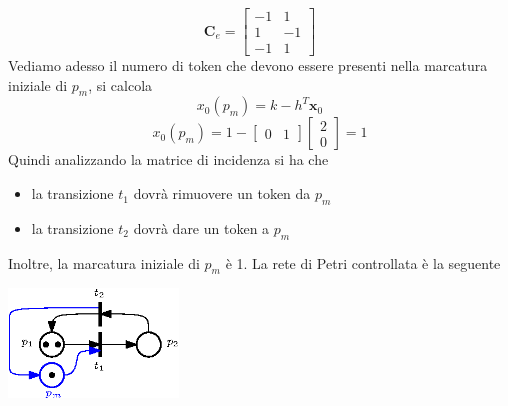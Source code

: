 \documentclass[10pt, letterpaper]{report}
\begin{document}
$$ \mathbf C_e=\begin{bmatrix}
    -1 & 1 \\ 
    1 & -1\\ 
    -1 & 1
    \end{bmatrix}$$
Vediamo adesso il numero di token che devono essere presenti nella marcatura iniziale di $p_m$, si calcola 
$$ x_0(p_m)=k-h^T\mathbf x_0$$
$$ x_0(p_m)=1-\begin{bmatrix}
    0 & 1
\end{bmatrix}\begin{bmatrix}
    2\\ 0
\end{bmatrix}=1$$
Quindi analizzando la matrice di incidenza si ha che\begin{itemize}
    \item la transizione $t_1$ dovrà rimuovere un token da $p_m$
    \item la transizione $t_2$ dovrà dare un token a $p_m$
\end{itemize}
Inoltre, la marcatura iniziale di $p_m$ è 1. La rete di Petri controllata è la seguente
\begin{center}
    \includegraphics[width=0.34\textwidth]{images/controlloPetri2.eps}
\end{center}
\end{document}
